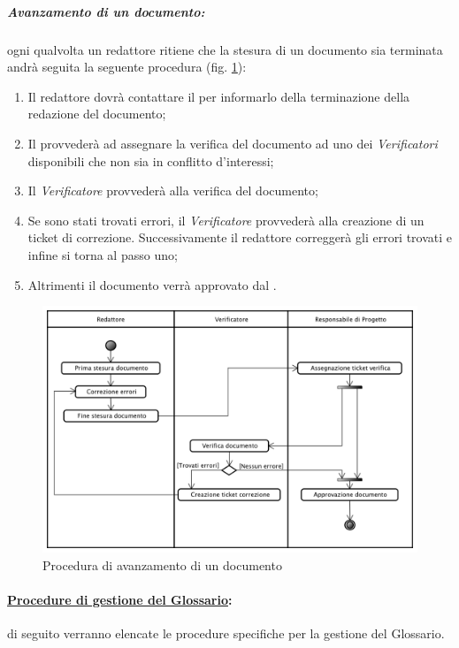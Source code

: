 \subparagraph{Avanzamento di un documento:}
ogni qualvolta un redattore ritiene che la stesura di un documento sia terminata andrà seguita la seguente procedura (fig. \ref{proc_avanzamento}):
\begin{enumerate}
\item Il redattore dovrà contattare il \projectManager{} per informarlo della terminazione della redazione del documento;
\item Il \projectManager{} provvederà ad assegnare la verifica del documento ad uno dei \emph{Verificatori} disponibili che non sia in conflitto d'interessi;
\item Il \emph{Verificatore} provvederà alla verifica del documento;
\item Se sono stati trovati errori, il \emph{Verificatore} provvederà alla creazione di un ticket di correzione.
Successivamente il redattore correggerà gli errori trovati e infine si torna al passo uno;
\item Altrimenti il documento verrà approvato dal \projectManager{}.
\end{enumerate}
\begin{figure}[!h]
\centering
	\includegraphics[scale=0.5]{./content/Immagini/Avanzamento_Documento.png}
	\caption{Procedura di avanzamento di un documento}
	\label{proc_avanzamento}
\end{figure}

\paragraph{\underline{Procedure di gestione del Glossario}:} di seguito verranno elencate le procedure specifiche per la gestione del Glossario.

